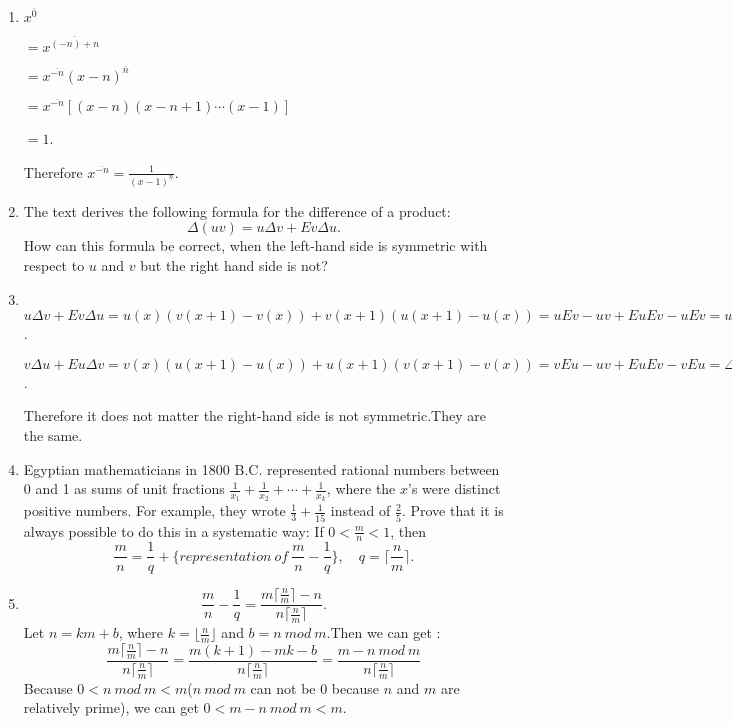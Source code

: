 \documentclass[12pt,a4paper]{article}
\makeatletter
\newtheorem*{solution}{Solution}
\theoremstyle{definition}
\renewenvironment{solution}[1][Solution] {\par\pushQED{\qed}\normalfont\topsep6\p@\@plus6\p@\relax\trivlist\item[\hskip\labelsep\bfseries#1\@addpunct{.}]\ignorespaces}{\popQED\endtrivlist\@endpefalse} \makeatother
\makeatother
\begin{document}
\begin{enumerate}
\begin{solution}
        	\quad$x^{\overline{0}}$
        	
        	$=x^{\overline{(-n)+n}}$
        	
        	$=x^{\overline{-n}} (x-n)^{\overline{n}}$
        	
        	$=x^{\overline{-n}}[(x-n)(x-n+1)\cdots(x-1)]$
        	
        	$=1$.
        	
        	Therefore $x^{\overline{-n}}=\frac{1}{(x-1)^{\underline{n}}}$.
        \end{solution}
    \item 
    The text derives the following formula for the difference of a product:
    \begin{equation*}
        \Delta(uv)=u\Delta v+Ev\Delta u.
    \end{equation*}
    How can this formula be correct, when the left-hand side is symmetric with respect to $u$ and $v$ but the right hand side is not?
            \begin{solution}
        	\quad\\
        	$u\Delta v+Ev\Delta u=u(x)(v(x+1)-v(x))+v(x+1)(u(x+1)-u(x))=uEv-uv+EuEv-uEv=u(x+1)v(x+1)-u(x)v(x)=\Delta(uv)$.
        	
        	$v\Delta u+Eu\Delta v=v(x)(u(x+1)-u(x))+u(x+1)(v(x+1)-v(x))=vEu-uv+EuEv-vEu=\Delta(uv) $.
        	
        	Therefore it does not matter the right-hand side is not symmetric.They are the same.
        \end{solution}
    \item
    Egyptian mathematicians in 1800 B.C.  represented rational numbers between 0 and 1 as sums of unit fractions $\frac{1}{x_1}+\frac{1}{x_2}+\cdots+\frac{1}{x_k}$, where the $x$'s were distinct positive numbers. For example, they wrote $\frac{1}{3}+\frac{1}{15}$ instead of $\frac{2}{5}$. Prove that it is always possible to do this in a systematic way: If $0<\frac{m}{n}<1$, then
        \begin{equation*}
            \frac{m}{n}=\frac{1}{q}+\{representation\ of\ \frac{m}{n}-\frac{1}{q}\},\quad q=\lceil \frac {n}{m}\rceil.
        \end{equation*} 
        \begin{solution}
        	\begin{equation*}
        	    \frac{m}{n}-\frac{1}{q}=\frac{m\lceil \frac{n}{m}\rceil -n}{n\lceil \frac{n}{m} \rceil}.
        	\end{equation*}
        	Let $n=km+b$, where $k=\lfloor \frac{n}{m} \rfloor$ and $b=n\ mod\ m$.Then we can get :
        	\begin{equation*}
        	    \frac{m\lceil \frac{n}{m}\rceil -n}{n\lceil \frac{n}{m} \rceil}=\frac{m(k+1)-mk-b}{n\lceil \frac{n}{m}\rceil}=\frac{m-n\ mod\ m}{n\lceil \frac{n}{m}\rceil}
        	\end{equation*}
        	Because $0<n\ mod\ m<m$($n\ mod\ m$ can not be $0$ because $n$ and $m$ are relatively prime), we can get $0<m-n\ mod\ m<m$.
        	

\end{solution}
\end{enumerate}
\end{document}
